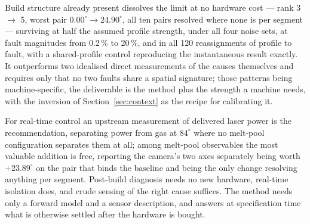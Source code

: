 \documentclass[preprint,times]{elsarticle}
\begin{document}
Build structure already present dissolves the limit at no hardware cost --- rank
3 $\rightarrow$ 5, worst pair $0.00^\circ \rightarrow 24.90^\circ$, all ten pairs
resolved where none is per segment --- surviving at half the assumed profile
strength, under all four noise sets, at fault magnitudes from 0.2\,\% to
20\,\%, and in all 120 reassignments of profile to fault, with a shared-profile
control reproducing the instantaneous result exactly. It outperforms two idealised direct measurements of
the causes themselves and requires only that no two faults share a spatial
signature; those patterns being machine-specific, the deliverable is the method
plus the strength a machine needs, with the inversion of
Section~\ref{sec:context} as the recipe for calibrating it.

For real-time control an upstream measurement of delivered laser power is the
recommendation, separating power from gas at $84^\circ$ where no melt-pool
configuration separates them at all; among melt-pool observables the most
valuable addition is free, reporting the camera's two axes separately being
worth $+23.89^\circ$ on the pair that binds the baseline and being the only
change resolving anything per segment. Post-build
diagnosis needs no new hardware, real-time isolation does, and crude sensing of
the right cause suffices. The method needs only a forward model and a sensor
description, and answers at specification time what is otherwise settled after
the hardware is bought.

\end{document}
